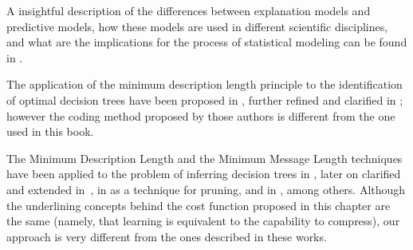 A insightful description of the differences between explanation models and predictive models, how these models are used in different scientific disciplines, and what are the implications for the process of statistical modeling can be found in \cite{shmueli2010explain}.

The application of the minimum description length principle to the identification of optimal decision trees have been proposed in \cite{quinlan1989inferring}, further refined and clarified in \cite{wallace1993coding}; however the coding method proposed by those authors is different from the one used in this book.

The Minimum Description Length \cite{grunwald2007minimum} and the Minimum Message Length \cite{wallace2005statistical} techniques have been applied to the problem of inferring decision trees in \cite{quinlan1989inferring}, later on clarified and extended in~\cite{wallace1993coding}, in \cite{mehta1995mdl} as a technique for pruning, and in \cite{rastogi1998public}, among others. Although the underlining concepts behind the cost function proposed in this chapter are the same (namely, that learning is equivalent to the capability to compress), our approach is very different from the ones described in these works.







